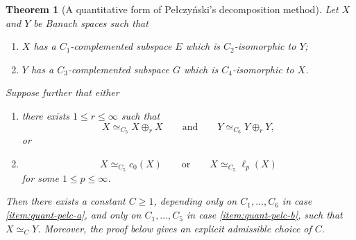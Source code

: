 \documentclass[10pt,a4paper]{amsart}
\newtheorem{theorem}{Theorem}
\renewcommand{\ge}{\geqslant}
\renewcommand{\le}{\leqslant}
\begin{document}
\begin{theorem}[A quantitative form of Pe{\l}czy\'nski's decomposition method]\label{thm:quant-pelc}
Let $X$ and $Y$ be Banach spaces such that
\begin{enumerate}[label=\textup{(\roman*)}]
    \item $X$ has a $C_1$-complemented subspace $E$ which is $C_2$-isomorphic to $Y$;
    \item $Y$ has a $C_3$-complemented subspace $G$ which is $C_4$-isomorphic to $X$.
\end{enumerate}
Suppose further that either
\begin{enumerate}[label=(\alph*), ref=(\alph*)]
    \item \label{item:quant-pelc-a}
    there exists $1 \le r \le \infty$ such that
    \[
        X \simeq_{C_5} X \oplus_r X
        \qquad\text{and}\qquad
        Y \simeq_{C_6} Y \oplus_r Y,
    \]
    or
    \item \label{item:quant-pelc-b}
    \[
        X \simeq_{C_5} c_0(X)
        \qquad\text{or}\qquad
        X \simeq_{C_5} \ell_p(X)
    \]
    for some $1 \le p \le \infty$.
\end{enumerate}
Then there exists a constant $C \ge 1$, depending only on $C_1,\dots,C_6$ in case \ref{item:quant-pelc-a}, and only on $C_1,\dots,C_5$ in case \ref{item:quant-pelc-b}, such that $X \simeq_C Y$.
Moreover, the proof below gives an explicit admissible choice of $C$.
\end{theorem}
\end{document}
